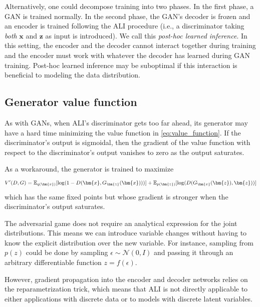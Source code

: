 \documentclass{article}
\begin{document}
Alternatively, one could decompose training into two phases. In the first phase,
a GAN is trained normally. In the second phase, the GAN's decoder is frozen and
an encoder is trained following the ALI procedure (i.e., a discriminator taking
{\em both} $\bm{x}$ and $\bm{z}$ as input is introduced). We call this {\em
post-hoc learned inference}. In this setting, the encoder and the decoder cannot
interact together during training and the encoder must work with whatever the
decoder has learned during GAN training. Post-hoc learned inference may be
suboptimal if this interaction is beneficial to modeling the data distribution.

\subsection{Generator value function}

As with GANs, when ALI's discriminator gets too far ahead, its generator may
have a hard time minimizing the value function in \autoref{eq:value_function}.
If the discriminator's output is sigmoidal, then the gradient of the value
function with respect to the discriminator's output vanishes to zero as the
output saturates.

As a workaround, the generator is trained to maximize
\begin{equation}
\label{eq:generator_value_function}
    V'(D, G) = \mathbb{E}_{q(\bm{x})}[\log(1 - D(\bm{x}, G_{\bm{z}}(\bm{x})))] +
               \mathbb{E}_{p(\bm{z})}[\log(D(G_{\bm{x}}(\bm{z}), \bm{z}))] \\
\end{equation}
which has the same fixed points but whose gradient is stronger when the
discriminator's output saturates.

The adversarial game does not require an analytical expression for the joint
distributions. This means we can introduce variable changes without having to
know the explicit distribution over the new variable.  For instance, sampling
from $p(z)$ could be done by sampling $\epsilon \sim \mathcal{N}(0, I)$ and
passing it through an arbitrary differentiable function $z = f(\epsilon)$.

However, gradient propagation into the encoder and decoder networks relies on
the reparametrization trick, which means that ALI is not directly
applicable to either applications with discrete data or to models with
discrete latent variables.
\end{document}
